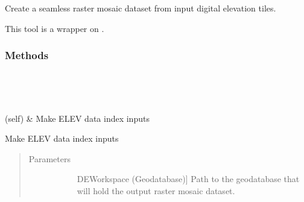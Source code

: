 \documentclass[letterpaper,10pt,english]{sphinxmanual}
\begin{document}
\begin{fulllineitems}
\label{\detokenize{StreamStats_DataPrep:StreamStats_DataPrep.makeELEVDATAIndex}}
Create a seamless raster mosaic dataset from input digital elevation tiles.

This tool is a wrapper on {\hyperref[\detokenize{elevationTools:elevationTools.elevIndex}]{}}.
\subsubsection*{Methods}


\begin{savenotes}\sphinxatlongtablestart\begin{longtable}{}
\hline

\endfirsthead

%
{}\\
\hline

\endhead

\hline
{}\\
\endfoot

\endlastfoot

{\hyperref[\detokenize{StreamStats_DataPrep:StreamStats_DataPrep.makeELEVDATAIndex.getParameterInfo}]{}}(self)
&
Make ELEV data index inputs
\\
\hline
\end{longtable}\sphinxatlongtableend\end{savenotes}

\begin{fulllineitems}
\label{\detokenize{StreamStats_DataPrep:StreamStats_DataPrep.makeELEVDATAIndex.getParameterInfo}}
Make ELEV data index inputs
\begin{quote}\begin{description}
\item[{Parameters}] \leavevmode\begin{description}
\item[{}] \leavevmode{[}DEWorkspace (Geodatabase){]}
Path to the geodatabase that will hold the output raster mosaic dataset.


\end{description}
\end{description}
\end{quote}
\end{fulllineitems}
\end{fulllineitems}
\end{document}
